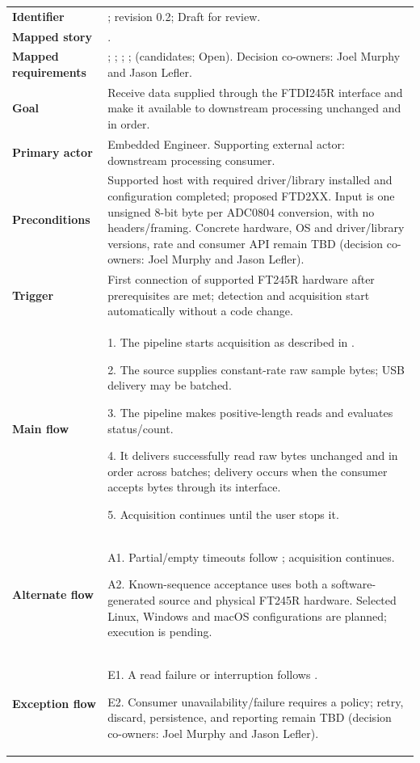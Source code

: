 \begin{tabularx}{\linewidth}{L{3.5cm}Y}
\toprule
\textbf{Identifier} & \label{Table:ProjectUC001}; revision 0.2; Draft for review.\\
\textbf{Mapped story} & .\\
\textbf{Mapped requirements} & ; ; ; ;  (candidates; Open). Decision co-owners: Joel Murphy and Jason Lefler.\\
\textbf{Goal} & Receive data supplied through the FTDI245R interface and make it available to downstream processing unchanged and in order.\\
\textbf{Primary actor} & Embedded Engineer. Supporting external actor: downstream processing consumer.\\
\textbf{Preconditions} & Supported host with required driver/library installed and configuration completed; proposed FTD2XX. Input is one unsigned 8-bit byte per ADC0804 conversion, with no headers/framing. Concrete hardware, OS and driver/library versions, rate and consumer API remain TBD (decision co-owners: Joel Murphy and Jason Lefler).\\
\textbf{Trigger} & First connection of supported FT245R hardware after prerequisites are met; detection and acquisition start automatically without a code change.\\
\textbf{Main flow} & 1. The pipeline starts acquisition as described in .\par 2. The source supplies constant-rate raw sample bytes; USB delivery may be batched.\par 3. The pipeline makes positive-length reads and evaluates status/count.\par 4. It delivers successfully read raw bytes unchanged and in order across batches; delivery occurs when the consumer accepts bytes through its interface.\par 5. Acquisition continues until the user stops it.\\
\textbf{Alternate flow} & A1. Partial/empty timeouts follow ; acquisition continues.\par A2. Known-sequence acceptance uses both a software-generated source and physical FT245R hardware. Selected Linux, Windows and macOS configurations are planned; execution is pending.\\
\textbf{Exception flow} & E1. A read failure or interruption follows .\par E2. Consumer unavailability/failure requires a policy; retry, discard, persistence, and reporting remain TBD (decision co-owners: Joel Murphy and Jason Lefler).\\

\end{tabularx}
